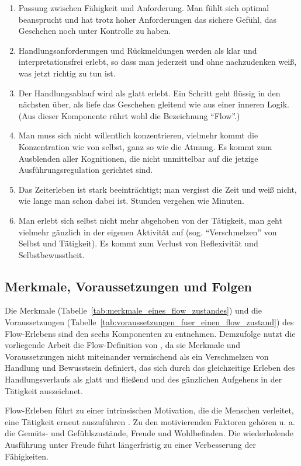 \begin{enumerate}
\item Passung zwischen Fähigkeit und Anforderung. Man fühlt sich optimal beansprucht und hat trotz hoher Anforderungen das sichere Gefühl, das Geschehen noch unter Kontrolle zu haben.
\item Handlungsanforderungen und Rückmeldungen werden als klar und interpretationsfrei erlebt, so dass man jederzeit und ohne nachzudenken weiß, was jetzt richtig zu tun ist.
\item Der Handlungsablauf wird als glatt erlebt. Ein Schritt geht flüssig in den nächsten über, als liefe das Geschehen gleitend wie aus einer inneren Logik. (Aus dieser Komponente rührt wohl die Bezeichnung "`Flow"'.)
\item Man muss sich nicht willentlich konzentrieren, vielmehr kommt die Konzentration wie von selbst, ganz so wie die Atmung. Es kommt zum Ausblenden aller Kognitionen, die nicht unmittelbar auf die jetzige Ausführungsregulation gerichtet sind.
\item Das Zeiterleben ist stark beeinträchtigt; man vergisst die Zeit und weiß nicht, wie lange man schon dabei ist. Stunden vergehen wie Minuten.
\item Man erlebt sich selbst nicht mehr abgehoben von der Tätigkeit, man geht vielmehr gänzlich in der eigenen Aktivität auf (sog. "`Verschmelzen"' von Selbst und Tätigkeit). Es kommt zum Verlust von Reflexivität und Selbstbewusstheit.
\end{enumerate}

\subsection{Merkmale, Voraussetzungen und Folgen}
\label{sub:merkmale_voraussetzungen_und_folgen}

Die Merkmale (Tabelle~\ref{tab:merkmale_eines_flow_zustandes}) und die Voraussetzungen (Tabelle~\ref{tab:voraussetzungen_fuer_einen_flow_zustand}) des Flow-Erlebens sind den sechs Komponenten zu entnehmen. Demzufolge nutzt die vorliegende Arbeit die Flow-Definition von \citet{Henk2014}, da sie Merkmale und Voraussetzungen nicht miteinander vermischend als ein Verschmelzen von Handlung und Bewusstsein definiert, das sich durch das gleichzeitige Erleben des Handlungsverlaufs als glatt und fließend und des gänzlichen Aufgehens in der Tätigkeit auszeichnet.

Flow-Erleben führt zu einer intrinsischen Motivation, die die Menschen verleitet, eine Tätigkeit erneut auszuführen \citep[vgl.][S.~602]{Csikszentmihalyi2005}. Zu den motivierenden Faktoren gehören u. a. die Gemüts- und Gefühlszustände, Freude und Wohlbefinden. Die wiederholende Ausführung unter Freude führt längerfristig zu einer Verbesserung der Fähigkeiten.

